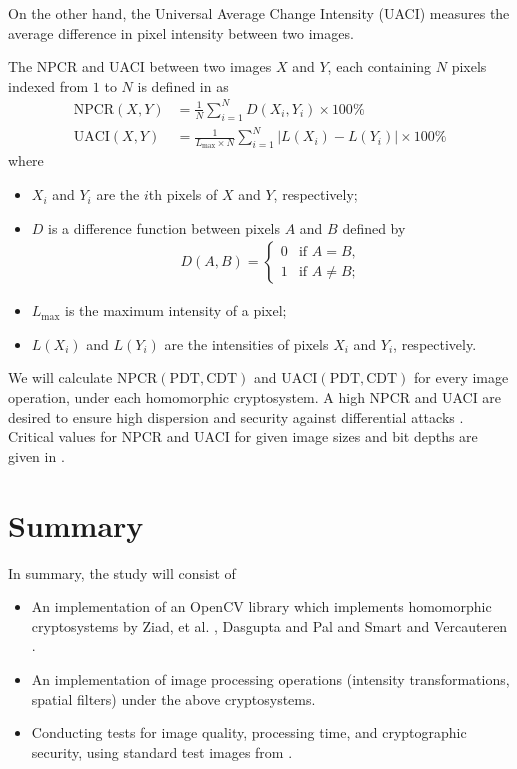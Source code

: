 \begin{description}
		On the other hand, the Universal Average Change Intensity (UACI) measures the average difference in pixel intensity between two images.

		The NPCR and UACI between two images $X$ and $Y$, each containing $N$ pixels indexed from $1$ to $N$ is defined in \cite{wu_npcr_2011} as
		\begin{align}
            \mathrm{NPCR}(X,Y) &= \frac{1}{N}\sum_{i = 1}^{N}{D(X_i,Y_i)} \times 100\%\\
            \mathrm{UACI}(X,Y) &= \frac{1}{L_{\max} \times N} \sum_{i = 1}^{N}{ |L(X_i) - L(Y_i)| } \times 100\%
		\end{align}
		where
		\begin{itemize}
			\item $X_i$ and $Y_i$ are the $i$th pixels of $X$ and $Y$, respectively;
			\item $D$ is a difference function between pixels $A$ and $B$ defined by
			\begin{align}
				D(A,B) =
				\begin{cases}
					0 &  \text{if $A = B$},\\
					1 &  \text{if $A \neq B$};
				\end{cases}
			\end{align}
		\item $L_{\max}$ is the maximum intensity of a pixel;
		\item $L(X_i)$ and $L(Y_i)$ are the intensities of pixels $X_i$ and $Y_i$, respectively.
		\end{itemize}
        We will calculate $\mathrm{NPCR}(\mathrm{PDT},\mathrm{CDT})$ and $\mathrm{UACI}(\mathrm{PDT},\mathrm{CDT})$  for every image operation, under each homomorphic cryptosystem. A high NPCR and UACI are desired to ensure high dispersion and security against differential attacks \cite{ahmed_benchmark_2016}. Critical values for NPCR and UACI for given image sizes and bit depths are given in  \cite{wu_npcr_2011}.
\end{description}

\section{Summary}

In summary, the study will consist of
\begin{itemize}
	\item An implementation of an OpenCV library which implements homomorphic cryptosystems by Ziad, et al. \cite{ziad_cryptoimg:_2016}, Dasgupta and Pal \cite{dasgupta_design_2016} and Smart and Vercauteren \cite{hutchison_fully_2010}.
	\item An implementation of image processing operations (intensity transformations, spatial filters) under the above cryptosystems.
	\item Conducting tests for image quality, processing time, and cryptographic security, using standard test images from \cite{gonzalez_image_nodate}.
\end{itemize}

